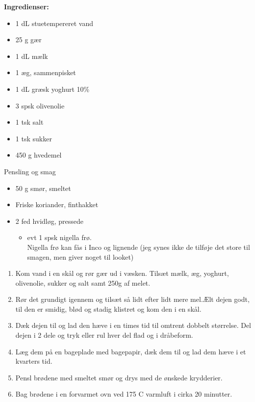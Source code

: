 \documentclass{book}
\begin{document}
\begin{minipage}[t]{0.5\textwidth}
\textbf{Ingredienser:}
\begin{itemize}
    \item 1 dL stuetempereret vand
    \item 25 g gær
    \item 1 dL mælk
    \item 1 æg, sammenpisket
    \item 1 dL græsk yoghurt 10\%
    \item 3 spsk olivenolie
    \item1 tsk salt
    \item1 tsk sukker
    \item450 g hvedemel
\end{itemize}
    Pensling og smag
\begin{itemize}
    \item 50 g smør, smeltet
    \item Friske koriander, finthakket
    \item 2 fed hvidløg, pressede
    \begin{itemize}
        \item  evt 1 spsk nigella frø. \\
        Nigella frø kan fås i Inco og lignende (jeg synes ikke de tilføje det store til smagen, men giver noget til looket)
        \end{itemize}
\end{itemize}
\end{minipage}
\begin{minipage}[t]{0.5\textwidth}
\begin{enumerate}
    \item Kom vand i en skål og rør gær ud i væsken. Tilsæt mælk, æg, yoghurt, olivenolie, sukker og salt samt 250g af  melet. 
    \item Rør det grundigt igennem og tilsæt så lidt efter lidt mere mel.Ælt dejen godt, til den er smidig, blød og stadig klistret og kom den i en skål.
    \item Dæk dejen til og lad den hæve i en times tid til omtrent dobbelt størrelse. Del dejen i 2 dele og tryk eller rul hver del flad og i dråbeform. 
    \item Læg dem på en bageplade med bagepapir, dæk dem til og lad dem hæve i et kvarters tid.
    \item Pensl brødene med smeltet smør og drys med de ønskede krydderier.
    \item Bag brødene i en forvarmet ovn ved 175 \degree C varmluft i cirka 20 minutter.

\end{enumerate}
\end{minipage}
\end{document}
